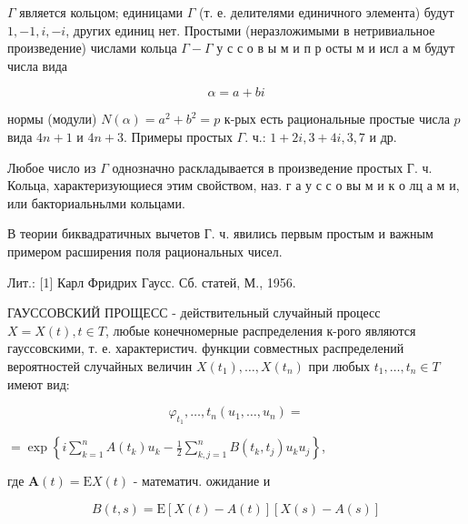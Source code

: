 \documentclass[10pt]{article}
\begin{document}
$\Gamma$ является кольцом; единицами $\Gamma$ (т. е. делителями единичного элемента) будут $1,-1, i,-i$, других единиц нет. Простыми (неразложимыми в нетривиальное произведение) числами кольца $\Gamma-\Gamma$ у с с о в ы м и п р осты м и исл а м будут числа вида



\[

\alpha=a+b i

\]



нормы (модули) $N(\alpha)=a^{2}+b^{2}=p$ к-рых есть рациональные простые числа $p$ вида $4 n+1$ и $4 n+3$. Примеры простых $\Gamma$. ч.: $1+2 i, 3+4 i, 3,7$ и др.



Любое число из $\Gamma$ однозначно раскладывается в произведение простых Г. ч. Кольца, характеризующиеся этим свойством, наз. г а у с с о вы м и к о лц а м и, или бакториальньлми кольцами.



В теории биквадратичных вычетов Г. ч. явились первым простым и важным примером расширения поля рациональных чисел.



Лит.: [1] Карл Фридрих Гаусс. Сб. статей, М., 1956.



ГАУССОВСКИЙ ПРОЩЕСС - действительный случайный процесс $X=X(t), t \in T$, любые конечномерные распределения к-рого являются гауссовскими, т. е. характеристич. функции совместных распределений вероятностей случайных величин $X\left(t_{1}\right), \ldots, X\left(t_{n}\right)$ при любых $t_{1}, \ldots, t_{n} \in T$ имеют вид:



\[

\varphi_{t_{1}}, \ldots, t_{n}\left(u_{1}, \ldots, u_{n}\right)=

\]



$=\exp \left\{i \sum_{k=1}^{n} A\left(t_{k}\right) u_{k}-\frac{1}{2} \sum_{k, j=1}^{n} B\left(t_{k}, t_{j}\right) u_{k} u_{j}\right\}$,



где $\boldsymbol{A}(t)=\mathrm{E} X(t)$ - математич. ожидание и



\[

B(t, s)=\mathrm{E}[X(t)-A(t)][X(s)-A(s)]

\]
\end{document}
